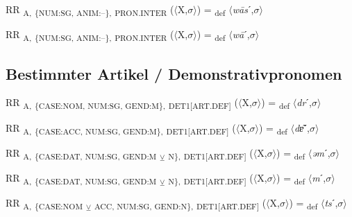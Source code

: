 {\begin{exe}
 RR \textsubscript{A,} \textsubscript{\{NUM:SG, ANIM:–\},} \textsubscript{PRON.INTER} ($\langle$X,$\sigma $$\rangle$) = \textsubscript{def} $\langle$\textit{w\=as}ˊ,$\sigma $$\rangle$
\end{exe}

\begin{exe}
 RR \textsubscript{A,} \textsubscript{\{NUM:SG, ANIM:–\},} \textsubscript{PRON.INTER} ($\langle$X,$\sigma $$\rangle$) = \textsubscript{def} $\langle$\textit{w\=a}ˊ,$\sigma $$\rangle$
\end{exe}

\subsection{Bestimmter Artikel / Demonstrativpronomen}

\begin{exe}
 RR \textsubscript{A,} \textsubscript{\{CASE:NOM, NUM:SG, GEND:M\},} \textsubscript{DET1[ART.DEF]} ($\langle$X,$\sigma $$\rangle$) = \textsubscript{def} $\langle$\textit{dr}ˊ,$\sigma $$\rangle$
\end{exe}

\begin{exe}
 RR \textsubscript{A,} \textsubscript{\{CASE:ACC, NUM:SG, GEND:M\},} \textsubscript{DET1[ART.DEF]} ($\langle$X,$\sigma $$\rangle$) = \textsubscript{def} $\langle$\textit{dɐ͂}ˊ,$\sigma $$\rangle$
\end{exe}

\begin{exe}
 RR \textsubscript{A,} \textsubscript{\{CASE:DAT, NUM:SG, GEND:M} \textsubscript{${\veebar}$}\textsubscript{ N\},} \textsubscript{DET1[ART.DEF]} ($\langle$X,$\sigma $$\rangle$) = \textsubscript{def} $\langle$\textit{əm}ˊ,$\sigma $$\rangle$
\end{exe}

\begin{exe}
 RR \textsubscript{A,} \textsubscript{\{CASE:DAT, NUM:SG, GEND:M} \textsubscript{${\veebar}$}\textsubscript{ N\},} \textsubscript{DET1[ART.DEF]} ($\langle$X,$\sigma $$\rangle$) = \textsubscript{def} $\langle$\textit{m}ˊ,$\sigma $$\rangle$
\end{exe}

\begin{exe}
 RR \textsubscript{A,} \textsubscript{\{CASE:NOM} \textsubscript{${\veebar}$}\textsubscript{ ACC, NUM:SG, GEND:N\},} \textsubscript{DET1[ART.DEF]} ($\langle$X,$\sigma $$\rangle$) = \textsubscript{def} $\langle$\textit{ts}ˊ,$\sigma $$\rangle$
\end{exe}

}

